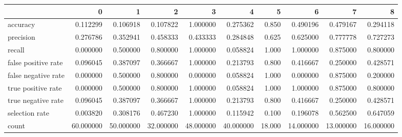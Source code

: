 \begin{tabular}{lrrrrrrrrr}
\toprule
{} &          0 &          1 &          2 &          3 &          4 &       5 &          6 &          7 &          8 \\
\midrule
accuracy            &   0.112299 &   0.106918 &   0.107822 &   1.000000 &   0.275362 &   0.850 &   0.490196 &   0.479167 &   0.294118 \\
precision           &   0.276786 &   0.352941 &   0.458333 &   0.433333 &   0.284848 &   0.625 &   0.625000 &   0.777778 &   0.727273 \\
recall              &   0.000000 &   0.500000 &   0.800000 &   1.000000 &   0.058824 &   1.000 &   1.000000 &   0.875000 &   0.800000 \\
false positive rate &   0.096045 &   0.387097 &   0.366667 &   1.000000 &   0.213793 &   0.800 &   0.416667 &   0.250000 &   0.428571 \\
false negative rate &   0.000000 &   0.500000 &   0.800000 &   0.000000 &   0.058824 &   1.000 &   0.000000 &   0.875000 &   0.200000 \\
true positive rate  &   0.000000 &   0.500000 &   0.800000 &   1.000000 &   0.058824 &   1.000 &   1.000000 &   0.875000 &   0.800000 \\
true negative rate  &   0.096045 &   0.387097 &   0.366667 &   1.000000 &   0.213793 &   0.800 &   0.416667 &   0.250000 &   0.428571 \\
selection rate      &   0.003820 &   0.308176 &   0.467230 &   1.000000 &   0.115942 &   0.100 &   0.196078 &   0.562500 &   0.647059 \\
count               &  60.000000 &  50.000000 &  32.000000 &  48.000000 &  40.000000 &  18.000 &  14.000000 &  13.000000 &  16.000000 \\
\bottomrule
\end{tabular}
